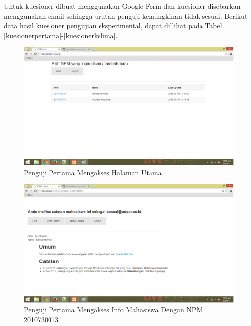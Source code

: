 Untuk kuesioner dibuat menggunakan Google Form dan kuesioner disebarkan menggunakan email sehingga urutan penguji kemungkinan tidak sesuai. Berikut data hasil kuesioner pengujian eksperimental, dapat dillihat pada Tabel \ref{kuesionerpertama}-\ref{kuesionerkelima}.

\begin{figure}[p]
\centering
\includegraphics[scale=0.44]{Gambar/eks1.png}
\caption[Penguji Pertama Mengakses Halaman Utama]{Penguji Pertama Mengakses Halaman Utama} 
\label{fig:eks1}
\end{figure}

\begin{figure}[p]
\centering
\includegraphics[scale=0.44]{Gambar/eks2.png}
\caption[Penguji Pertama Mengakses Info Mahasiswa Dengan NPM 2010730013]{Penguji Pertama Mengakses Info Mahasiswa Dengan NPM 2010730013} 
\label{fig:eks2}
\end{figure}

